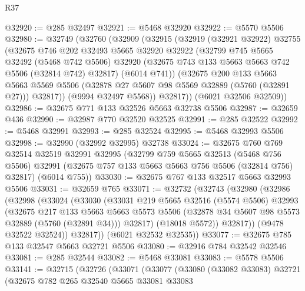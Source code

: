 \begin{lexlean}{R37}
\begin{coremodule}
@32920 := @285 @32497
@32921 := @5468 @32920
@32922 := @5570 @5506
@32980 := @32749
    (@32760
      (@32909
        (@32915
          (@32919
            (@32921 @32922)
            @32755
            (@32675
              @746
              @202
              @32493
              @5665
              @32920
              @32922
              (@32799
                @745
                @5665
                @32492
                (@5468 @742 @5506)
                @32920
                (@32675 @743 @133 @5663 @5663 @742 @5506 (@32814 @742) @32817)
                (@6014 @741))
              (@32675
                @200
                @133
                @5663
                @5663
                @5569
                @5506
                (@32878 @27 @5607 @98 @5569 @32889 (@5760 (@32891 @27)))
                @32817))
            (@9994 @32497 @5568))
          @32817))
      (@6021 @32506 @32509))
@32986 := @32675 @771 @133 @32526 @5663 @32738 @5506
@32987 := @32659 @436
@32990 := @32987 @770 @32520 @32525
@32991 := @285 @32522
@32992 := @5468 @32991
@32993 := @285 @32524
@32995 := @5468 @32993 @5506
@32998 := @32990 (@32992 @32995) @32738
@33024 := @32675
    @760
    @769
    @32514
    @32519
    @32991
    @32995
    (@32799
      @759
      @5665
      @32513
      (@5468 @756 @5506)
      @32991
      (@32675 @757 @133 @5663 @5663 @756 @5506 (@32814 @756) @32817)
      (@6014 @755))
@33030 := @32675 @767 @133 @32517 @5663 @32993 @5506
@33031 := @32659 @765
@33071 := @32732
    (@32743
      (@32980
        (@32986
          (@32998
            (@33024
              (@33030
                (@33031
                  @219
                  @5665
                  @32516
                  (@5574 @5506)
                  @32993
                  (@32675
                    @217
                    @133
                    @5663
                    @5663
                    @5573
                    @5506
                    (@32878 @34 @5607 @98 @5573 @32889 (@5760 (@32891 @34)))
                    @32817)
                  (@18018 @5572))
                @32817))
            (@9478 @32522 @32524))
          @32817))
      (@6021 @32532 @32535))
@33077 := @32675 @785 @133 @32547 @5663 @32721 @5506
@33080 := @32916 @784 @32542 @32546
@33081 := @285 @32544
@33082 := @5468 @33081
@33083 := @5578 @5506
@33141 := @32715
    (@32726
      (@33071
        (@33077
          (@33080
            (@33082 @33083)
            @32721
            (@32675
              @782
              @265
              @32540
              @5665
              @33081
              @33083

\end{coremodule}
\end{lexlean}
